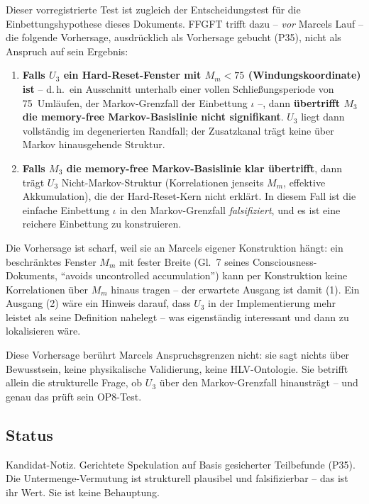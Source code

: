 Dieser vorregistrierte Test ist zugleich der Entscheidungstest für die
Einbettungshypothese dieses Dokuments. FFGFT trifft dazu -- \emph{vor}
Marcels Lauf -- die folgende Vorhersage, ausdrücklich als Vorhersage
gebucht (P35), nicht als Anspruch auf sein Ergebnis:

\begin{enumerate}
  \item \textbf{Falls $U_3$ ein Hard-Reset-Fenster mit $M_m < 75$
    (Windungskoordinate) ist} -- d.\,h.\ ein Ausschnitt unterhalb einer
    vollen Schließungsperiode von 75~Umläufen, der Markov-Grenzfall der Einbettung $\iota$ --, dann
    \textbf{übertrifft $M_3$ die memory-free Markov-Basislinie nicht
    signifikant}. $U_3$ liegt dann vollständig im degenerierten Randfall;
    der Zusatzkanal trägt keine über Markov hinausgehende Struktur.
  \item \textbf{Falls $M_3$ die memory-free Markov-Basislinie klar
    übertrifft}, dann trägt $U_3$ Nicht-Markov-Struktur (Korrelationen
    jenseits $M_m$, effektive Akkumulation), die der Hard-Reset-Kern nicht
    erklärt. In diesem Fall ist die einfache Einbettung $\iota$ in den
    Markov-Grenzfall \emph{falsifiziert}, und es ist eine reichere
    Einbettung zu konstruieren.
\end{enumerate}

Die Vorhersage ist scharf, weil sie an Marcels eigener Konstruktion hängt:
ein beschränktes Fenster $M_m$ mit fester Breite (Gl.~7 seines
Consciousness-Dokuments, \enquote{avoids uncontrolled accumulation}) kann
per Konstruktion keine Korrelationen über $M_m$ hinaus tragen -- der
erwartete Ausgang ist damit (1). Ein Ausgang (2) wäre ein Hinweis darauf,
dass $U_3$ in der Implementierung mehr leistet als seine Definition nahelegt
-- was eigenständig interessant und dann zu lokalisieren wäre.

Diese Vorhersage berührt Marcels Anspruchsgrenzen nicht: sie sagt nichts
über Bewusstsein, keine physikalische Validierung, keine HLV-Ontologie. Sie
betrifft allein die strukturelle Frage, ob $U_3$ über den Markov-Grenzfall
hinausträgt -- und genau das prüft sein OP8-Test.

\subsection*{Status}

Kandidat-Notiz. Gerichtete Spekulation auf Basis gesicherter Teilbefunde
(P35). Die Untermenge-Vermutung ist strukturell plausibel und
falsifizierbar -- das ist ihr Wert. Sie ist keine Behauptung.
